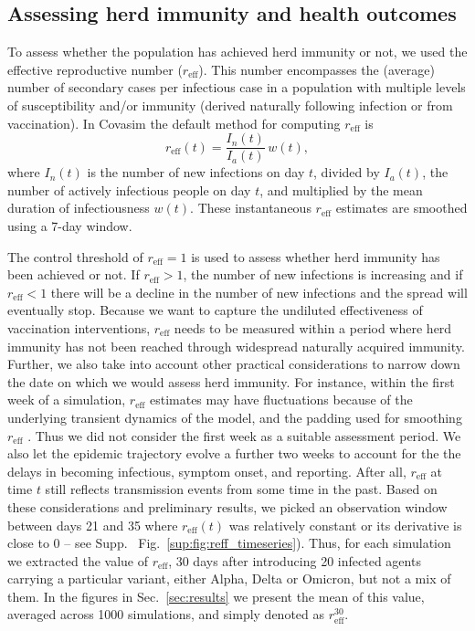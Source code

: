 \documentclass[article, a4, authoryear]{elsarticle}
\begin{document}
\subsection{Assessing herd immunity and health outcomes}
\label{subsec:metrics}
To assess whether the population has achieved herd immunity or not, we used the effective reproductive number ($r_\mathrm{eff}$). This number encompasses the (average) number of secondary cases per infectious case in a population with multiple levels of susceptibility and/or immunity (derived naturally following infection or from vaccination). In Covasim the default method for computing $r_\mathrm{eff}$ is
\begin{equation}
r_{\mathrm{eff}}(t) = \frac{I_{n}(t)}{I_{a}(t)}\,w(t), 
\end{equation}
where $I_{n}(t)$ is the number of new infections on day $t$, divided by $I_{a}(t)$, the number of actively infectious people on day $t$, and multiplied by the mean duration of infectiousness $w(t)$. These instantaneous $r_\mathrm{eff}$ estimates are smoothed using a 7-day window.  

The control threshold of $r_\mathrm{eff}=1$ is used to assess whether herd immunity has been achieved or not. If $r_\mathrm{eff}>1$, the number of new infections is increasing and if $r_\mathrm{eff} < 1$ there will be a decline in the number of new infections and the spread will eventually stop. Because we want to capture the undiluted effectiveness of vaccination interventions,  $r_\mathrm{eff}$ needs to be measured within a period where herd immunity has not been reached through widespread naturally acquired immunity. Further, we also take into account other practical considerations to narrow down the date on which we would assess herd immunity. For instance, within the first week of a simulation, $r_\mathrm{eff}$ estimates may have fluctuations \cite{li2022ptrsa-estimation} because of the underlying transient dynamics of the model, and the padding used for smoothing $r_\mathrm{eff}$ \cite{ackland2022ptrsa-fitting}. Thus we did not consider the first week as a suitable assessment period. We also let the epidemic trajectory evolve a further two weeks to account for the 
the delays in becoming infectious, symptom onset, and reporting. After all, $r_\mathrm{eff}$ at time $t$ still reflects transmission events from some time in the past.
Based on these considerations and preliminary results, we picked an observation window between days 21 and 35 where $r_\mathrm{eff}(t)$ was relatively constant or its derivative is close to 0  -- see Supp.~ Fig.~\ref{sup:fig:reff_timeseries}). Thus, for each simulation we extracted the value of $r_\mathrm{eff}$, 30 days after introducing 20 infected agents carrying a particular variant, either Alpha, Delta or Omicron, but not a mix of them. In the figures in Sec.~\ref{sec:results} we present the mean of this value, averaged across 1000 simulations, and simply denoted as $r_\mathrm{eff}^{30}$. 
\end{document}
